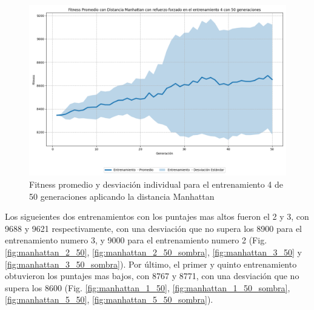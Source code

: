 \documentclass[conference]{IEEEtran}
\begin{document}
\begin{figure}[H]
    \centering
    \includegraphics[width=0.9\linewidth]{Manhattan/Fitness_Individual_50Gen/Fitness_4_Manh_50Gen_Sombra.png}
    \caption{Fitness promedio y desviación individual para el entrenamiento 4 de 50 generaciones aplicando la distancia Manhattan}
    \label{fig:Fitnes_ecu_4_50_inv_sombra_1}
\end{figure}
Los sigueientes dos entrenamientos con los puntajes mas altos fueron el 2 y 3, con 9688 y 9621 respectivamente, con una desviación que no supera los 8900 para el entrenamiento numero 3, y 9000 para el entrenamiento numero 2 (Fig. \ref{fig:manhattan_2_50}, \ref{fig:manhattan_2_50_sombra}, \ref{fig:manhattan_3_50} y \ref{fig:manhattan_3_50_sombra}). Por último, el primer y quinto entrenamiento obtuvieron los puntajes mas bajos, con 8767 y 8771, con una desviación que no supera los 8600 (Fig. \ref{fig:manhattan_1_50}, \ref{fig:manhattan_1_50_sombra}, \ref{fig:manhattan_5_50}, \ref{fig:manhattan_5_50_sombra}).
\end{document}
